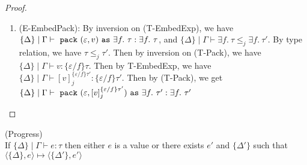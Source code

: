 \begin{lemma}
\begin{proof}
\begin{enumerate}
\item (E-EmbedPack): By inversion on (T-EmbedExp), we have $\{\Delta\} \mid \Gamma \vdash \ \texttt{pack}\  (\varepsilon, v) \ \texttt{as}\  \exists f.\ \tau : \exists f.\ \tau$, and $\{\Delta\} \mid \Gamma \vdash \exists f.\ \tau \leq_j \exists f.\ \tau'$. By type relation, we have $\tau \leq_j \tau'$. Then by inversion on (T-Pack), we have $\{\Delta\} \mid \Gamma \vdash v :\{\varepsilon / f\}\tau$. Then by T-EmbedExp, we have $\{\Delta\}\mid\Gamma \vdash [v]^{\{\varepsilon / f\}\tau'}_j : \{\varepsilon / f\}\tau'$. Then by (T-Pack), we get $\{\Delta\}\mid\Gamma \vdash \ \texttt{pack}\  (\varepsilon, [v]^{\{\varepsilon / f\}\tau'}_j) \ \texttt{as}\  \exists f.\ \tau' :\exists f.\ \tau'$


\end{enumerate}
\end{proof}

\end{lemma}

\begin{lemma} (Progress)\\
If $\{\Delta\} \mid \Gamma \vdash e : \tau$ then either $e$ is a value or there exists $e'$ and $\{\Delta'\}$ such that $\langle \{\Delta\}, e \rangle \mapsto \langle \{\Delta'\}, e' \rangle$
\end{lemma}




